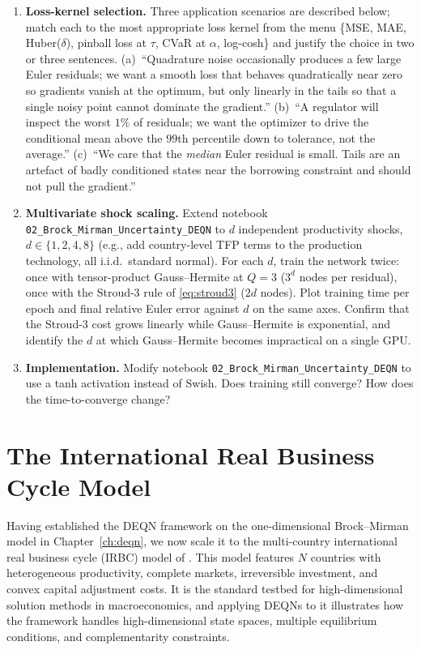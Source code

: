 \documentclass[11pt,a4paper]{report}
\begin{document}
\begin{enumerate}[itemsep=4pt, leftmargin=*]
\item\label{ex:ch2:6} \textbf{Loss-kernel selection.}  Three application scenarios are described below; match each to the most appropriate loss kernel from the menu \{MSE, MAE, Huber($\delta$), pinball loss at $\tau$, CVaR at $\alpha$, log-cosh\} and justify the choice in two or three sentences.  (a)~``Quadrature noise occasionally produces a few large Euler residuals; we want a smooth loss that behaves quadratically near zero so gradients vanish at the optimum, but only linearly in the tails so that a single noisy point cannot dominate the gradient.''  (b)~``A regulator will inspect the worst $1\%$ of residuals; we want the optimizer to drive the conditional mean above the $99$th percentile down to tolerance, not the average.''  (c)~``We care that the \emph{median} Euler residual is small.  Tails are an artefact of badly conditioned states near the borrowing constraint and should not pull the gradient.''
\item\label{ex:ch2:7} \textbf{Multivariate shock scaling.}  Extend notebook \texttt{02\_Brock\_Mirman\_Uncertainty\_DEQN} to $d$ independent productivity shocks, $d \in \{1, 2, 4, 8\}$ (e.g., add country-level TFP terms to the production technology, all i.i.d.\ standard normal).  For each $d$, train the network twice: once with tensor-product Gauss--Hermite at $Q=3$ ($3^d$ nodes per residual), once with the Stroud-3 rule of \eqref{eq:stroud3} ($2d$ nodes).  Plot training time per epoch and final relative Euler error against $d$ on the same axes.  Confirm that the Stroud-3 cost grows linearly while Gauss--Hermite is exponential, and identify the $d$ at which Gauss--Hermite becomes impractical on a single GPU.
\item\label{ex:ch2:8} \textbf{Implementation.}  Modify notebook \texttt{02\_Brock\_Mirman\_Uncertainty\_DEQN} to use a tanh activation instead of Swish.  Does training still converge?  How does the time-to-converge change?
\end{enumerate}


\chapter{The International Real Business Cycle Model}
\label{ch:irbc}

Having established the DEQN framework on the one-dimensional Brock--Mirman model in Chapter~\ref{ch:deqn}, we now scale it to the multi-country international real business cycle (IRBC) model of \citet{backus1992international}.  This model features $N$ countries with heterogeneous productivity, complete markets, irreversible investment, and convex capital adjustment costs.  It is the standard testbed for high-dimensional solution methods in macroeconomics, and applying DEQNs to it illustrates how the framework handles high-dimensional state spaces, multiple equilibrium conditions, and complementarity constraints.
\end{document}
